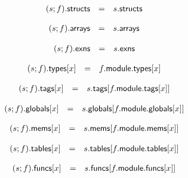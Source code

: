 $$
\begin{array}[t]{@{}lcl@{}l@{}}
(s ; f){.}\mathsf{structs} & = & s{.}\mathsf{structs} \\
\end{array}
$$

$$
\begin{array}[t]{@{}lcl@{}l@{}}
(s ; f){.}\mathsf{arrays} & = & s{.}\mathsf{arrays} \\
\end{array}
$$

$$
\begin{array}[t]{@{}lcl@{}l@{}}
(s ; f){.}\mathsf{exns} & = & s{.}\mathsf{exns} \\
\end{array}
$$

\vspace{1ex}

$$
\begin{array}[t]{@{}lcl@{}l@{}}
(s ; f){.}\mathsf{types}{}[x] & = & f{.}\mathsf{module}{.}\mathsf{types}{}[x] \\
\end{array}
$$

$$
\begin{array}[t]{@{}lcl@{}l@{}}
(s ; f){.}\mathsf{tags}{}[x] & = & s{.}\mathsf{tags}{}[f{.}\mathsf{module}{.}\mathsf{tags}{}[x]] \\
\end{array}
$$

$$
\begin{array}[t]{@{}lcl@{}l@{}}
(s ; f){.}\mathsf{globals}{}[x] & = & s{.}\mathsf{globals}{}[f{.}\mathsf{module}{.}\mathsf{globals}{}[x]] \\
\end{array}
$$

$$
\begin{array}[t]{@{}lcl@{}l@{}}
(s ; f){.}\mathsf{mems}{}[x] & = & s{.}\mathsf{mems}{}[f{.}\mathsf{module}{.}\mathsf{mems}{}[x]] \\
\end{array}
$$

$$
\begin{array}[t]{@{}lcl@{}l@{}}
(s ; f){.}\mathsf{tables}{}[x] & = & s{.}\mathsf{tables}{}[f{.}\mathsf{module}{.}\mathsf{tables}{}[x]] \\
\end{array}
$$

$$
\begin{array}[t]{@{}lcl@{}l@{}}
(s ; f){.}\mathsf{funcs}{}[x] & = & s{.}\mathsf{funcs}{}[f{.}\mathsf{module}{.}\mathsf{funcs}{}[x]] \\
\end{array}
$$

